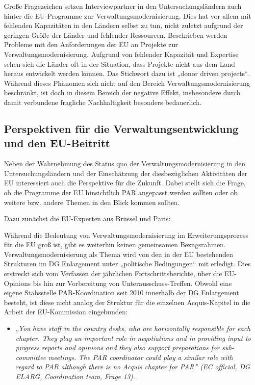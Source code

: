 \par
Große Fragezeichen setzen Interviewpartner in den Untersuchungsländern auch hinter die EU-Programme zur Verwaltungsmodernisierung. Dies hat vor allem mit fehlenden Kapazitäten in den Ländern selbst zu tun, nicht zuletzt aufgrund der geringen Größe der Länder und fehlender Ressourcen. Beschrieben werden Probleme mit den Anforderungen der EU an Projekte zur Verwaltungsmodernisierung. Aufgrund von fehlender Kapazität und Expertise sehen sich die Länder oft in der Situation, dass Projekte nicht aus dem Land heraus entwickelt werden können. Das Stichwort dazu ist „donor driven projects“. Während dieses Phänomen sich nicht auf den Bereich Verwaltungsmodernisierung beschränkt, ist doch in diesem Bereich der negative Effekt, insbesondere durch damit verbundene fragliche Nachhaltigkeit besonders bedauerlich.
\subsection{Perspektiven für die Verwaltungsentwicklung und den EU-Beitritt }
Neben der Wahrnehmung des Status quo der Verwaltungsmodernisierung in den Untersuchungsländern und der Einschätzung der diesbezüglichen Aktivitäten der EU interessiert auch die Perspektive für die Zukunft. Dabei stellt sich die Frage, ob die Programme der EU hinsichtlich PAR angepasst werden sollten oder ob weitere bzw. andere Themen in den Blick kommen sollten.\par
Dazu zunächst die EU-Experten aus Brüssel und Paris: \par
Während die Bedeutung von Verwaltungsmodernisierung im Erweiterungsprozess für die EU groß ist, gibt es weiterhin keinen gemeinsamen Bezugsrahmen. Verwaltungsmodernisierung als Thema wird von den in der EU bestehenden Strukturen im DG Enlargement unter „politische Bedingungen“ mit erledigt. Dies erstreckt sich vom Verfassen der jährlichen Fortschrittsberichte, über die EU-Opinions bis hin zur Vorbereitung von Unterausschuss-Treffen. Obwohl eine eigene Stabsstelle PAR-Koordination seit 2010 innerhalb der DG Enlargement besteht, ist diese nicht analog der Struktur für die einzelnen Acquis-Kapitel in die Arbeit der EU-Kommission eingebunden:
\begin{itemize}[label={}]
\item \textit{„You have staff in the country desks, who are horizontally responsible for each chapter. They play an important role in negotiations and in providing input to progress reports and opinions and they also support preparations for sub-committee meetings. The PAR coordinator could play a similar role with regard to PAR although there is no Acquis chapter for PAR” (EC official, DG ELARG, Coordination team, Frage 13). }
\end{itemize}
